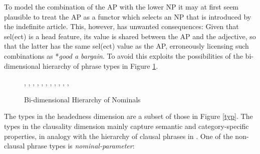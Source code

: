 \documentclass[output=paper]{langsci/langscibook}
\begin{document}
To model the combination of the AP with the lower NP it may at first seem 
plausible to treat the AP as a functor which selects  
an NP that is introduced by the indefinite article. This, however, has 
unwanted consequences: Given that {\sc sel(ect)} is a {\sc head} feature, 
its value is shared between the AP and the adjective, so that the latter 
has the same {\sc sel(ect)} value as the AP, erroneously licensing such 
combinations as *{\it good a bargain}. To avoid this 
\citet{VanEynde18} exploits the possibilities of 
the bi-dimensional hierarchy of phrase types in Figure \ref{prot}. 

\begin{figure}
\begin{center} 
\footnotesize
\tree
    {,
      {, 
        {,
          {,
            {,
              {}}, 
            {}}}},
      {,
        {,
          {,
            {,
              {}}}}}}
\caption{ \label{prot} Bi-dimensional Hierarchy of Nominals} 
\normalsize
\end{center} 
\end{figure}

The types in the {\sc headedness} dimension are a subset of those in Figure \ref{typ}.  
The types in the {\sc clausality} dimension mainly capture semantic and 
category-specific properties, in analogy with the hierarchy of clausal phrases 
in \citet{GS00}. One of the non-clausal phrase types is {\it nominal-parameter}: 
\end{document}
